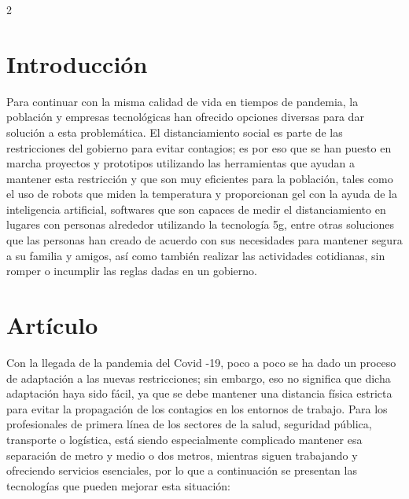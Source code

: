\documentclass[12pt,spanish,Letterpaper,openany]{book}
\begin{document}
\begin {multicols}{2}
\hypertarget{introducciuxf3n-7}{%
\section{Introducción}\label{introducciuxf3n-7}}

Para continuar con la misma calidad de vida en tiempos de pandemia, la población y empresas tecnológicas han ofrecido opciones diversas para dar solución a esta problemática. El distanciamiento social es parte de las restricciones del gobierno para evitar contagios; es por eso que se han puesto en marcha proyectos y prototipos utilizando las herramientas que ayudan a mantener esta restricción y que son muy eficientes para la población, tales como el uso de robots que miden la temperatura y proporcionan gel con la ayuda de la inteligencia artificial, softwares que son capaces de medir el distanciamiento en lugares con personas alrededor utilizando la tecnología 5g, entre otras soluciones que las personas han creado de acuerdo con sus necesidades para mantener segura a su familia y amigos, así como también realizar las actividades cotidianas, sin romper o incumplir las reglas dadas en un gobierno.

\hypertarget{artuxedculo-7}{%
\section{Artículo}\label{artuxedculo-7}}

Con la llegada de la pandemia del Covid -19, poco a poco se ha dado un proceso de adaptación a las nuevas restricciones; sin embargo, eso no significa que dicha adaptación haya sido fácil, ya que se debe mantener una distancia física estricta para evitar la propagación de los contagios en los entornos de trabajo. Para los profesionales de primera línea de los sectores de la salud, seguridad pública, transporte o logística, está siendo especialmente complicado mantener esa separación de metro y medio o dos metros, mientras siguen trabajando y ofreciendo servicios esenciales, por lo que a continuación se presentan las tecnologías que pueden mejorar esta situación:


\end{multicols}
\end{document}
